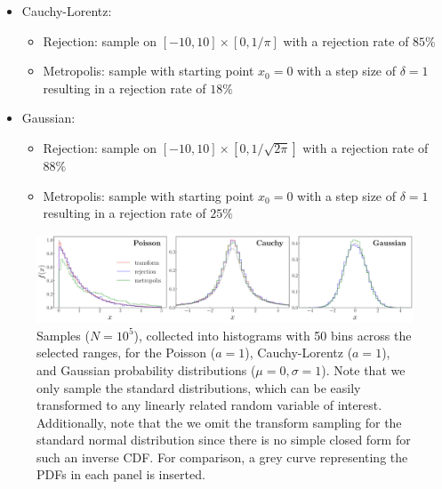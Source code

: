 {\begin{itemize}
\begin{itemize}
        \item Rejection: sample on $[0,10] \times [0,1]$ with a rejection rate of $90\%$
        \item Metropolis: sample with starting point $x_0 = 1$ with a step size of $\delta = 0.1$ resulting in a rejection rate of $5\%$

    \end{itemize}

    \item Cauchy-Lorentz:
    \begin{itemize}
       
        \item Rejection: sample on $[-10,10] \times [0,1/\pi]$ with a rejection rate of $85\%$
        \item Metropolis: sample with starting point $x_0 = 0$ with a step size of $\delta = 1$ resulting in a rejection rate of $18\%$

    \end{itemize}

    \item Gaussian:
    \begin{itemize}
       
        \item Rejection: sample on $[-10,10] \times [0,1/\sqrt{2 \pi}]$ with a rejection rate of $88\%$
        \item Metropolis: sample with starting point $x_0 = 0$ with a step size of $\delta = 1$ resulting in a rejection rate of $25\%$

    \end{itemize}


    
\end{itemize}



\begin{figure}[h!]
    \centering
    \includegraphics[width=\textwidth]{prob2.pdf}
    \caption{Samples ($N = 10^{5}$), collected into histograms with 50 bins across the selected ranges, for the Poisson ($a = 1$), Cauchy-Lorentz ($a = 1$), and Gaussian probability distributions ($\mu = 0, \sigma = 1$). Note that we only sample the standard distributions, which can be easily transformed to any linearly related random variable of interest. Additionally, note that the we omit the transform sampling for the standard normal distribution since there is no simple closed form for such an inverse CDF. For comparison, a grey curve representing the PDFs in each panel is inserted.}
    \label{fig:prob2}
\end{figure}


}
